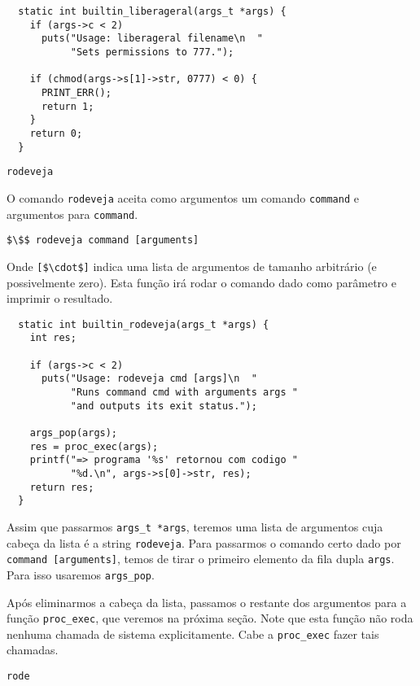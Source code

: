 \documentclass{amsart}
\makeatletter
\def\subsection{\@startsection{subsection}{3}%
  \z@{.5\linespacing\@plus.7\linespacing}{.1\linespacing}%
  {\normalfont\itshape}}
\theoremstyle{plain}
\newcommand{\code}[1]{\lstinline[mathescape=true]{#1}}
\newcommand{\mcode}[1]{\lstinline[mathescape]!#1!}
\makeatother
\begin{document}
\begin{verbatim}
  static int builtin_liberageral(args_t *args) {
    if (args->c < 2)
      puts("Usage: liberageral filename\n  "
           "Sets permissions to 777.");

    if (chmod(args->s[1]->str, 0777) < 0) {
      PRINT_ERR();
      return 1;
    }
    return 0;
  }
\end{verbatim}

\subsection{\code{rodeveja}}

O comando \code{rodeveja} aceita como argumentos um comando \code{command} e argumentos para
\code{command}.

\begin{lstlisting}[mathescape=true,style=nonumbers]
  $\$$ rodeveja command [arguments]
\end{lstlisting}

Onde \mcode{[$\cdot$]} indica uma lista de argumentos de tamanho arbitrário (e possivelmente zero).
Esta função irá rodar o comando dado como parâmetro e imprimir o resultado.

\begin{verbatim}
  static int builtin_rodeveja(args_t *args) {
    int res;

    if (args->c < 2)
      puts("Usage: rodeveja cmd [args]\n  "
           "Runs command cmd with arguments args "
           "and outputs its exit status.");

    args_pop(args);
    res = proc_exec(args);
    printf("=> programa '%s' retornou com codigo "
           "%d.\n", args->s[0]->str, res);
    return res;
  }
\end{verbatim}

Assim que passarmos \code{args_t *args}, teremos uma lista de argumentos cuja cabeça da lista é a
string \code{rodeveja}. Para passarmos o comando certo dado por \code{command [arguments]}, temos
de tirar o primeiro elemento da fila dupla \code{args}. Para isso usaremos \code{args_pop}.

Após eliminarmos a cabeça da lista, passamos o restante dos argumentos para a função
\code{proc_exec}, que veremos na próxima seção. Note que esta função não roda nenhuma chamada de
sistema explicitamente. Cabe a \code{proc_exec} fazer tais chamadas.

\subsection{\code{rode}}
\end{document}
